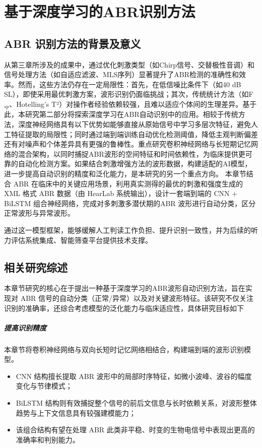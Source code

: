 \chapter{基于深度学习的ABR识别方法}

\section{ABR 识别方法的背景及意义}
从第三章所涉及的成果中，通过优化刺激类型（如Chirp信号、交替极性音调）和信号处理方法（如自适应滤波、MLS序列）显著提升了ABR检测的准确性和效率。然而，这些方法仍存在一定局限性：首先，在低信噪比条件下（如40 dB SL），即使采用最优刺激方案，波形识别仍面临挑战；其次，传统统计方法（如F$_{sp}$、Hotelling's T²）对操作者经验依赖较强，且难以适应个体间的生理差异。基于此，本研究第二部分将探索深度学习在ABR自动识别中的应用。相较于传统方法，深度神经网络具有以下优势如能够直接从原始信号中学习多层次特征，避免人工特征提取的局限性；同时通过端到端训练自动优化检测阈值，降低主观判断偏差还有对噪声和个体差异具有更强的鲁棒性。重点研究卷积神经网络与长短期记忆网络的混合架构，以同时捕捉ABR波形的空间特征和时间依赖性，为临床提供更可靠的自动化检测方案。如果结合刺激增强方法的波形数据，构建适配的AI模型，进一步提高自动识别的精度和泛化能力，是本研究的另一个重点方向。
本章节结合 ABR 在临床中的关键应用场景，利用真实测得的最优的刺激和强度生成的 XML 格式 ABR 数据（由 HearLab 系统输出），设计一套端到端的 CNN + BiLSTM 组合神经网络，完成对多刺激多潜伏期的ABR 波形进行自动分类，区分正常波形与异常波形。

通过这一模型框架，能够缓解人工判读工作负担、提升识别一致性，并为后续的听力评估系统集成、智能筛查平台提供技术支撑。

\section{相关研究综述}
本章节研究的核心在于提出一种基于深度学习的ABR波形自动识别方法，旨在实现对 ABR 信号的自动分类（正常/异常）以及对关键波形特征。该研究不仅关注识别的准确率，还综合考虑模型的泛化能力与临床适应性，具体研究目标如下

\paragraph*{提高识别精度}
本章节将卷积神经网络与双向长短时记忆网络相结合，构建端到端的波形识别模型。

\begin{itemize}
    \item CNN 结构擅长提取 ABR 波形中的局部时序特征，如微小波峰、波谷的幅度变化与节律模式；
    \item BiLSTM 结构则有效捕捉整个信号的前后文信息与长时依赖关系，对波形整体趋势与上下文信息具有较强建模能力；
    \item 该组合结构有望在处理 ABR 此类非平稳、时变的生物电信号中表现出更高的准确率和判别能力。
\end{itemize}

